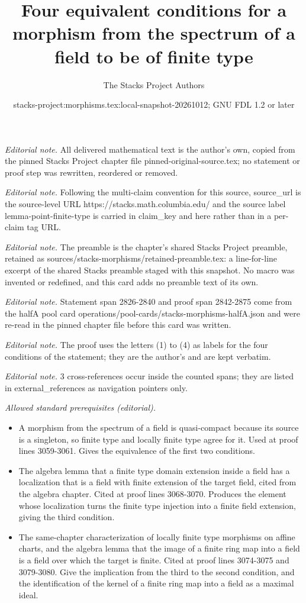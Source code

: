 \documentclass[10pt,a4paper]{amsart}
\title{Four equivalent conditions for a morphism from the spectrum of a field to be of finite type}
\author{The Stacks Project Authors}
\date{stacks-project:morphisms.tex:local-snapshot-20261012; GNU FDL 1.2 or later}
\theoremstyle{plain}
\theoremstyle{definition}
\theoremstyle{remark}
\numberwithin{equation}{subsection}
\begin{document}
\maketitle
\noindent\textit{Editorial note.} All delivered mathematical text is the author's own, copied from the pinned Stacks Project chapter file pinned-original-source.tex; no statement or proof step was rewritten, reordered or removed.\par\medskip
\noindent\textit{Editorial note.} Following the multi-claim convention for this source, source\_url is the source-level URL https://stacks.math.columbia.edu/ and the source label lemma-point-finite-type is carried in claim\_key and here rather than in a per-claim tag URL.\par\medskip
\noindent\textit{Editorial note.} The preamble is the chapter's shared Stacks Project preamble, retained as sources/stacks-morphisms/retained-preamble.tex: a line-for-line excerpt of the shared Stacks preamble staged with this snapshot. No macro was invented or redefined, and this card adds no preamble text of its own.\par\medskip
\noindent\textit{Editorial note.} Statement span 2826-2840 and proof span 2842-2875 come from the halfA pool card operations/pool-cards/stacks-morphisms-halfA.json and were re-read in the pinned chapter file before this card was written.\par\medskip
\noindent\textit{Editorial note.} The proof uses the letters (1) to (4) as labels for the four conditions of the statement; they are the author's and are kept verbatim.\par\medskip
\noindent\textit{Editorial note.} 3 cross-references occur inside the counted spans; they are listed in external\_references as navigation pointers only.\par\medskip
\noindent\textit{Allowed standard prerequisites (editorial).}\begin{itemize}
\item A morphism from the spectrum of a field is quasi-compact because its source is a singleton, so finite type and locally finite type agree for it. Used at proof lines 3059-3061. Gives the equivalence of the first two conditions.
\item The algebra lemma that a finite type domain extension inside a field has a localization that is a field with finite extension of the target field, cited from the algebra chapter. Cited at proof lines 3068-3070. Produces the element whose localization turns the finite type injection into a finite field extension, giving the third condition.
\item The same-chapter characterization of locally finite type morphisms on affine charts, and the algebra lemma that the image of a finite ring map into a field is a field over which the target is finite. Cited at proof lines 3074-3075 and 3079-3080. Give the implication from the third to the second condition, and the identification of the kernel of a finite ring map into a field as a maximal ideal.
\end{itemize}\medskip
\end{document}
